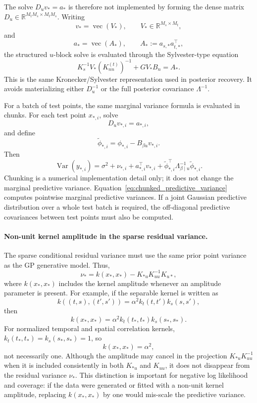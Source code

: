 \documentclass[12pt]{article}
\newcommand{\Var}{\operatorname{Var}}
\newcommand{\vecop}{\operatorname{vec}}
\begin{document}
The solve \(D_uv_*=a_*\) is therefore not implemented by forming the dense
matrix \(D_u\in\mathbb{R}^{M_tM_s\times M_tM_s}\).  Writing
\[
    v_*=\vecop(V_*),
    \qquad
    V_*\in\mathbb{R}^{M_s\times M_t},
\]
and
\[
    a_*=\vecop(A_*),
    \qquad
    A_*:=a_{s,*}a_{t,*}^{\top},
\]
the structured \(u\)-block solve is evaluated through the Sylvester-type equation
\begin{equation}
    K_s^{-1}V_*(K_{nn}^{(t)})^{-1}
    +
    GV_*B_n
    =
    A_* .
    \label{eq:prediction_sylvester_solve}
\end{equation}
This is the same Kronecker/Sylvester representation used in posterior recovery.
It avoids materializing either \(D_u^{-1}\) or the full posterior covariance
\(\Lambda^{-1}\).

For a batch of test points, the same marginal variance formula is evaluated in
chunks.  For each test point \(x_{*,i}\), solve
\[
    D_uv_{*,i}=a_{*,i},
\]
and define
\[
    \tilde{\phi}_{*,i}
    =
    \phi_{*,i}-B_{\beta u}v_{*,i}.
\]
Then
\begin{equation}
    \Var(y_{*,i})
    =
    \sigma^2+\nu_{*,i}
    +
    a_{*,i}^{\top}v_{*,i}
    +
    \tilde{\phi}_{*,i}^{\top}
    \Lambda_{\beta\mid u}^{-1}
    \tilde{\phi}_{*,i}.
    \label{eq:chunked_predictive_variance}
\end{equation}
Chunking is a numerical implementation detail only; it does not change the
marginal predictive variance.  Equation~\eqref{eq:chunked_predictive_variance}
computes pointwise marginal predictive variances.  If a joint Gaussian
predictive distribution over a whole test batch is required, the off-diagonal
predictive covariances between test points must also be computed.

\paragraph{Non-unit kernel amplitude in the sparse residual variance.}
The sparse conditional residual variance must use the same prior point variance
as the GP generative model.  Thus,
\begin{equation}
    \nu_*
    =
    k(x_*,x_*)
    -
    K_{*u}K_{uu}^{-1}K_{u*},
\end{equation}
where \(k(x_*,x_*)\) includes the kernel amplitude whenever an amplitude
parameter is present.  For example, if the separable kernel is written as
\[
    k((t,s),(t',s'))
    =
    \alpha^2 k_t(t,t')k_s(s,s'),
\]
then
\begin{equation}
    k(x_*,x_*)
    =
    \alpha^2 k_t(t_*,t_*)k_s(s_*,s_*).
\end{equation}
For normalized temporal and spatial correlation kernels,
\(k_t(t_*,t_*)=k_s(s_*,s_*)=1\), so
\[
    k(x_*,x_*)=\alpha^2,
\]
not necessarily one.  Although the amplitude may cancel in the projection
\(K_{*u}K_{uu}^{-1}\) when it is included consistently in both \(K_{*u}\) and
\(K_{uu}\), it does not disappear from the residual variance \(\nu_*\).  This
distinction is important for negative log likelihood and coverage: if the data
were generated or fitted with a non-unit kernel amplitude, replacing
\(k(x_*,x_*)\) by one would mis-scale the predictive variance.
\end{document}
